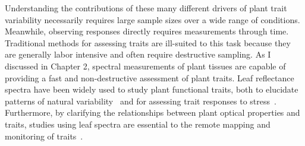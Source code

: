 Understanding the contributions of these many different drivers of plant trait variability necessarily requires large sample sizes over a wide range of conditions.
Meanwhile, observing responses directly requires measurements through time.
Traditional methods for assessing traits are ill-suited to this task because they are generally labor intensive and often require destructive sampling.
As I discussed in Chapter 2, spectral measurements of plant tissues are capable of providing a fast and non-destructive assessment of plant traits.
Leaf reflectance spectra have been widely used to study plant functional traits,
both to elucidate patterns of natural variability~\cite{cavenderbares_2017_harnessing,asner_2015_quantifying}
and for assessing trait responses to stress~\cite{serbin_spectroscopic_2014,bayat_2016_remote,sun_2018_reflectance}.
Furthermore, by clarifying the relationships between plant optical properties and traits, studies using leaf spectra are essential to the remote mapping and monitoring of traits~\cite{schneider2017_mapping,schimel2013_observing,schimel2015_observing,jetz2016_diversity}.


